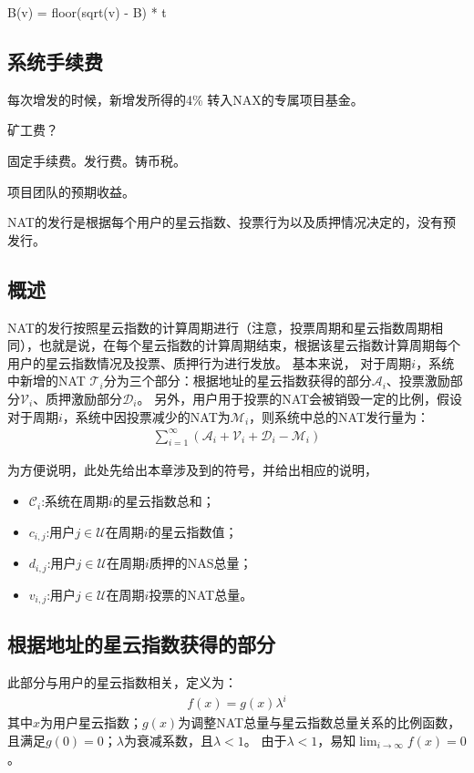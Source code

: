 B(v) =  floor(sqrt(v) - B) * t

\subsection{系统手续费}
每次增发的时候，新增发所得的4\% 转入NAX的专属项目基金。

矿工费？

固定手续费。发行费。铸币税。

项目团队的预期收益。



NAT的发行是根据每个用户的星云指数、投票行为以及质押情况决定的，没有预发行。

\subsection{概述}
NAT的发行按照星云指数的计算周期进行（注意，投票周期和星云指数周期相同），也就是说，在每个星云指数的计算周期结束，根据该星云指数计算周期每个用户的星云指数情况及投票、质押行为进行发放。
基本来说，
对于周期$i$，系统中新增的NAT $\mathcal{T}_i$分为三个部分：根据地址的星云指数获得的部分$\mathcal{A}_i$、投票激励部分$\mathcal{V}_i$、质押激励部分$\mathcal{D}_i$。
另外，用户用于投票的NAT会被销毁一定的比例，假设对于周期$i$，系统中因投票减少的NAT为$\mathcal{M}_i$，则系统中总的NAT发行量为：
\begin{align}
\sum_{i=1}^{\infty} (\mathcal{A}_i + \mathcal{V}_i + \mathcal{D}_i - \mathcal{M}_i)
\end{align}

为方便说明，此处先给出本章涉及到的符号，并给出相应的说明，
\begin{itemize}
\item $\mathcal{C}_i$:系统在周期$i$的星云指数总和；
\item $c_{i,j}$:用户$j \in \mathcal{U}$在周期$i$的星云指数值；
\item $d_{i,j}$:用户$j \in \mathcal{U}$在周期$i$质押的NAS总量；
\item $v_{i,j}$:用户$j \in \mathcal{U}$在周期$i$投票的NAT总量。
\end{itemize}

\subsection{根据地址的星云指数获得的部分}
此部分与用户的星云指数相关，定义为：
\begin{align}
    f(x) = g(x)\lambda^i
\end{align}
\noindent 其中$x$为用户星云指数；$g(x)$为调整NAT总量与星云指数总量关系的比例函数，且满足$g(0) = 0$；$\lambda$为衰减系数，且$\lambda < 1$。
由于$\lambda < 1$，易知$\lim_{i\to \infty}f(x) = 0$。

